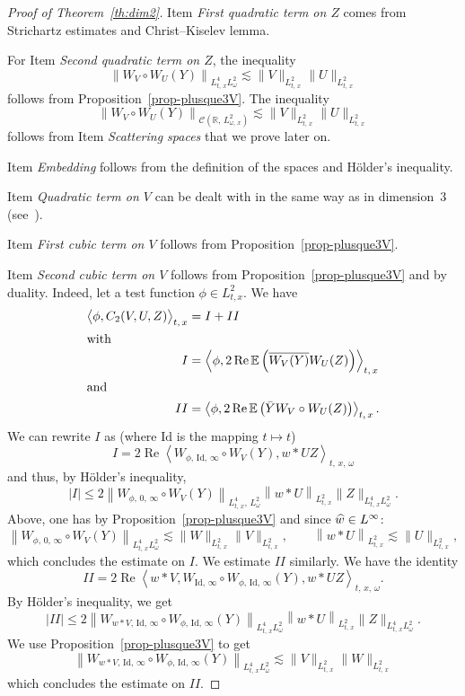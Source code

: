 \documentclass[AHL, Unicode, longabstracts,published]{cedram}
\newcommand{\R}{\mathbb{R}}
\newcommand{\E}{\mathbb{E}}
\DeclareMathOperator{\re}{Re}
\newcommand{\Id}{\mathrm{Id}}
\newcommand{\mclC}{\mathcal{C}}
\let\oldhat\hat
\renewcommand*{\hat}[1]{\mathchoice{\widehat{#1}}{\widehat{#1}}{\oldhat{#1}}{\oldhat{#1}}}
\begin{document}
\begin{proof}[Proof of Theorem~\ref{th:dim2}]
Item \emph{First quadratic term on $Z$} comes from Strichartz estimates and Christ--Kiselev lemma.

For Item \emph{Second quadratic term on $Z$}, the inequality
\[
\left\|W_V\circ W_U (Y) \right\|_{L^4_{t,\,x} L^2_\omega} \lesssim \|V\|_{L^2_{t,\,x}} \|U\|_{L^2_{t,\,x}}
\]
follows from Proposition~\ref{prop-plusque3V}. The inequality
\[
\left\|W_V\circ W_U (Y) \right\|_{\mclC\left(\R,\,L^2_{\omega,\,x}\right)} \lesssim \|V\|_{L^2_{t,\,x}} \|U\|_{L^2_{t,\,x}}
\]
follows from Item \emph{Scattering spaces} that we prove later on.

Item \emph{Embedding} follows from the definition of the spaces and H\"older's inequality.

Item \emph{Quadratic term on $V$} can be dealt with in the same way as in dimension~3 (see~\cite{lewsab2}).

Item \emph{First cubic term on $V$} follows from Proposition~\ref{prop-plusque3V}.

Item \emph{Second cubic term on $V$} follows from Proposition~\ref{prop-plusque3V} and by duality. Indeed, let a test function $\phi \in L^2_{t,x}$. We have
\begin{align*}
\big\langle\phi, C_2(V,U,Z)\big\rangle_{t,\,x} &= I + II
\\
\intertext{with}
I &= \left\langle\phi, 2\re \E\left(\overline{W_V(Y)} W_U(Z)\right)\right\rangle_{t,\,x} \\
\intertext{and}
II &= \left\langle\phi,2\re \E \left(\bar Y W_V \circ W_U (Z)\right)\right\rangle_{t,\,x}.
\end{align*}
We can rewrite $I$ as (where $\Id$ is the mapping $t\mapsto t$)
\[
I = 2 \re \left\langle W_{\phi,\,\Id,\,\infty} \circ W_V (Y), w* U Z\right\rangle_{t,\,x,\,\omega}
\]
and thus, by H\"older's inequality,
\[
|I| \leq 2 \left\| W_{\phi,\,0,\,\infty} \circ W_V (Y)\right\|_{L^4_{t,\,x},\,L^2_\omega} \left\|w*U\right\|_{L^2_{t,\,x}} \|Z\|_{L^4_{t,\,x} L^2_\omega}.
\]
Above, one has by Proposition~\ref{prop-plusque3V} and since $\hat w\in L^{\infty}$:
\[
\left\| W_{\phi,\,0,\,\infty} \circ W_V (Y)\right\|_{L^4_{t,\,x} L^2_\omega} \lesssim \|W\|_{L^2_{t,\,x}} \|V\|_{L^2_{t,\,x}}, \qquad  \left\|w*U\right\|_{L^2_{t,\,x}} \lesssim \|U\|_{L^2_{t,\,x}},
\]
which concludes the estimate on $I$. We estimate $II$ similarly. We have the identity
\[
II = 2 \re \left\langle w*V,W_{\Id,\,\infty} \circ W_{\phi,\,\Id,\,\infty}(Y), w*U Z\right\rangle_{t,\,x,\,\omega}.
\]
By H\"older's inequality, we get
\[
|II|\leq 2 \left\|W_{w*V,\,\Id,\,\infty} \circ W_{\phi,\,\Id,\,\infty}(Y)\right\|_{L^4_{t,\,x} L^2_\omega}\left\|w*U\right\|_{L^2_{t,\,x}} \|Z\|_{L^4_{t,\,x} L^2_\omega}.
\]
We use Proposition~\ref{prop-plusque3V} to get
\[
\left\|W_{w*V,\,\Id,\,\infty} \circ W_{\phi,\,\Id,\,\infty}(Y)\right\|_{L^4_{t,\,x} L^2_\omega} \lesssim \|V\|_{L^2_{t,\,x}} \|W\|_{L^2_{t,\,x}}
\]
which concludes the estimate on $II$.


\end{proof}
\end{document}
